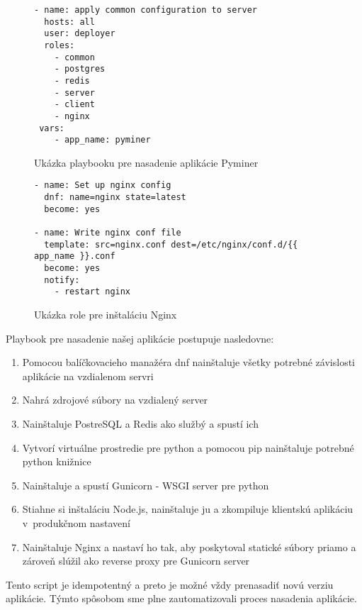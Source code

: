 \begin{figure}[htbp]
\centering
\begin{minipage}{0.9\textwidth}
\lstset{columns=flexible,breaklines=true,breakatwhitespace=true, showstringspaces=false}
\begin{lstlisting}
- name: apply common configuration to server
  hosts: all
  user: deployer
  roles:
    - common
    - postgres
    - redis
    - server
    - client
    - nginx
 vars:
  	- app_name: pyminer
\end{lstlisting} 		
\end{minipage} 
\caption{Ukázka playbooku pre nasadenie aplikácie Pyminer}
\label{fig:playbook}
\end{figure}

\begin{figure}[htbp]
\centering
\begin{minipage}{0.9\textwidth}
\lstset{columns=flexible,breaklines=true,breakatwhitespace=true, showstringspaces=false}
\begin{lstlisting}
- name: Set up nginx config
  dnf: name=nginx state=latest
  become: yes

- name: Write nginx conf file
  template: src=nginx.conf dest=/etc/nginx/conf.d/{{ app_name }}.conf
  become: yes
  notify:
    - restart nginx
\end{lstlisting} 		
\end{minipage} 
\caption{Ukázka role pre inštaláciu Nginx}
\label{fig:role}
\end{figure}
 
Playbook pre nasadenie našej aplikácie postupuje nasledovne:

\begin{enumerate}
  \item Pomocou balíčkovacieho manažéra dnf nainštaluje všetky potrebné závislosti aplikácie na vzdialenom servri
  \item Nahrá zdrojové súbory na vzdialený server
  \item Nainštaluje PostreSQL a Redis ako službý a spustí ich
  \item Vytvorí virtuálne prostredie pre python a pomocou pip nainštaluje potrebné python knižnice
  \item Nainštaluje a spustí Gunicorn - WSGI server pre python
  \item Stiahne si inštaláciu Node.js, nainštaluje ju a zkompiluje klientskú aplikáciu v~produkčnom nastavení
  \item Nainštaluje Nginx a nastaví ho tak, aby poskytoval statické súbory priamo a zároveň slúžil ako reverse proxy pre Gunicorn server
\end{enumerate}


Tento script je idempotentný a preto je možné vždy prenasadiť novú verziu aplikácie.
Týmto spôsobom sme plne zautomatizovali proces nasadenia aplikácie. 



